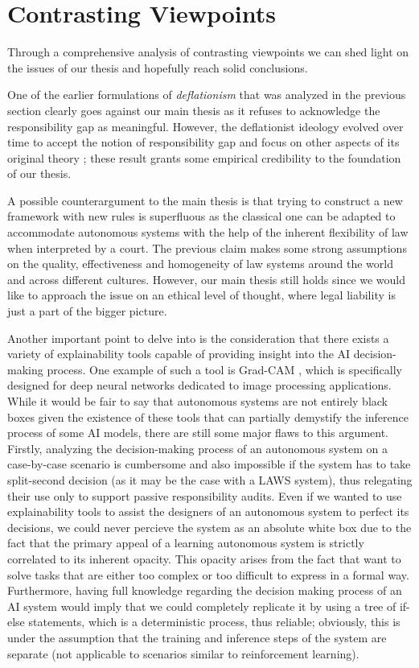 \section{Contrasting Viewpoints}\label{sec:viewpoints}

Through a comprehensive analysis of contrasting viewpoints we can shed light on the issues of our thesis and hopefully reach solid conclusions.

One of the earlier formulations of \textit{deflationism} \parencite{HAYTMP} that was analyzed in the previous section clearly goes against our main thesis as it refuses to acknowledge the responsibility gap as meaningful.
However, the deflationist ideology evolved over time to accept the notion of responsibility gap and focus on other aspects of its original theory \parencite{SIJWA}; these result grants some empirical credibility to the foundation of our thesis.

A possible counterargument to the main thesis is that trying to construct a new framework with new rules is superfluous as the classical one can be adapted to accommodate autonomous systems with the help of the inherent flexibility of law when interpreted by a court.
The previous claim makes some strong assumptions on the quality, effectiveness and homogeneity of law systems around the world and across different cultures.
However, our main thesis still holds since we would like to approach the issue on an ethical level of thought, where legal liability is just a part of the bigger picture.

Another important point to delve into is the consideration that there exists a variety of explainability tools capable of providing insight into the AI decision-making process.
One example of such a tool is Grad-CAM \parencite{RAMGCW}, which is specifically designed for deep neural networks dedicated to image processing applications.
While it would be fair to say that autonomous systems are not entirely black boxes given the existence of these tools that can partially demystify the inference process of some AI models, there are still some major flaws to this argument.
Firstly, analyzing the decision-making process of an autonomous system on a case-by-case scenario is cumbersome and also impossible if the system has to take split-second decision (as it may be the case with a LAWS system), thus relegating their use only to support passive responsibility audits.
Even if we wanted to use explainability tools to assist the designers of an autonomous system to perfect its decisions, we could never percieve the system as an absolute white box due to the fact that the primary appeal of a learning autonomous system is strictly correlated to its inherent opacity.
This opacity arises from the fact that want to solve tasks that are either too complex or too difficult to express in a formal way.
Furthermore, having full knowledge regarding the decision making process of an AI system would imply that we could completely replicate it by using a tree of if-else statements, which is a deterministic process, thus reliable; obviously, this is under the assumption that the training and inference steps of the system are separate (not applicable to scenarios similar to reinforcement learning).